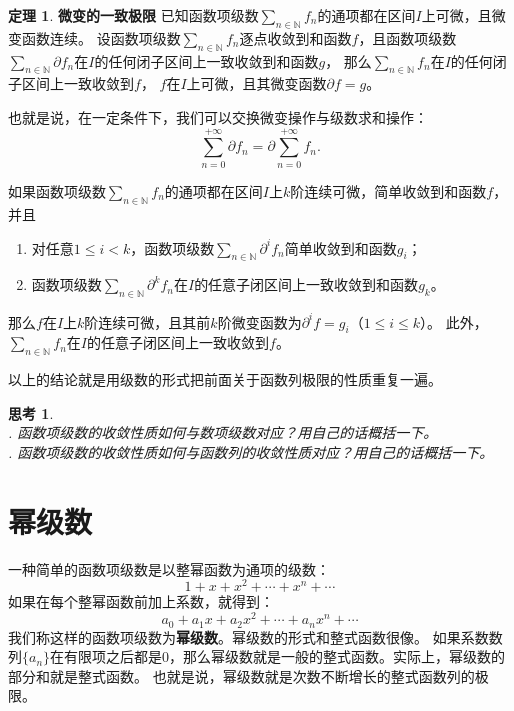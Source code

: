 \documentclass[12pt,UTF8]{ctexbook}
\theoremstyle{definition}
\newtheorem{tm}{定理}[section]
\theoremstyle{plain}
\newtheorem{sk}{思考}[section]
\begin{document}
\begin{tm}{\textbf{微变的一致极限}}
    已知函数项级数$\sum_{n\in\mathbb{N}} f_n$的通项都在区间$I$上可微，且微变函数连续。
    设函数项级数$\sum_{n\in\mathbb{N}} f_n$逐点收敛到和函数$f$，且函数项级数$\sum_{n\in\mathbb{N}} \partial f_n$在$I$的任何闭子区间上一致收敛到和函数$g$，
    那么$\sum_{n\in\mathbb{N}} f_n$在$I$的任何闭子区间上一致收敛到$f$，
    $f$在$I$上可微，且其微变函数$\partial f = g$。

    也就是说，在一定条件下，我们可以交换微变操作与级数求和操作：
    $$ \sum_{n=0}^{+\infty} \partial f_n = \partial \sum_{n=0}^{+\infty} f_n. $$
    
    如果函数项级数$\sum_{n\in\mathbb{N}} f_n$的通项都在区间$I$上$k$阶连续可微，简单收敛到和函数$f$，并且
    \begin{enumerate}
        \item 对任意$1 \leqslant i < k$，函数项级数$\sum_{n\in\mathbb{N}} \partial^i f_n$简单收敛到和函数$g_i$；
        \item 函数项级数$\sum_{n\in\mathbb{N}} \partial^k f_n$在$I$的任意子闭区间上一致收敛到和函数$g_k$。
    \end{enumerate}
    那么$f$在$I$上$k$阶连续可微，且其前$k$阶微变函数为$\partial^i f = g_i$（$1 \leqslant i\leqslant k$）。
    此外，$\sum_{n\in\mathbb{N}} f_n$在$I$的任意子闭区间上一致收敛到$f$。
\end{tm}

以上的结论就是用级数的形式把前面关于函数列极限的性质重复一遍。

\begin{sk}
    \mbox{} \\
    . 函数项级数的收敛性质如何与数项级数对应？用自己的话概括一下。\\
    . 函数项级数的收敛性质如何与函数列的收敛性质对应？用自己的话概括一下。
\end{sk}

\chapter{幂级数}

一种简单的函数项级数是以整幂函数为通项的级数：
$$ 1 + x + x^2 + \cdots + x^n + \cdots$$
如果在每个整幂函数前加上系数，就得到：
$$ a_0 + a_1x + a_2x^2 + \cdots + a_n x^n + \cdots$$
我们称这样的函数项级数为\textbf{幂级数}。幂级数的形式和整式函数很像。
如果系数数列$\{a_n\}$在有限项之后都是$0$，那么幂级数就是一般的整式函数。实际上，幂级数的部分和就是整式函数。
也就是说，幂级数就是次数不断增长的整式函数列的极限。
\end{document}
